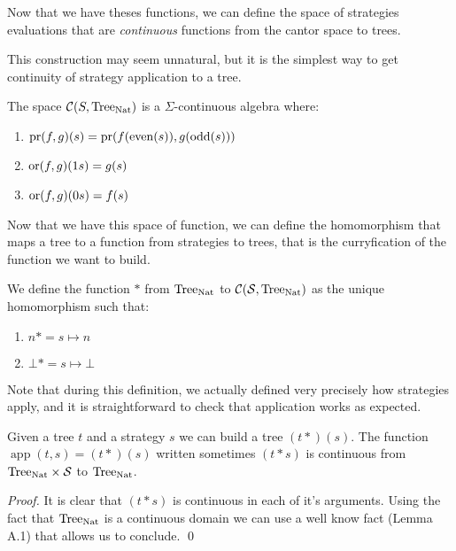 Now that we have theses functions, we can define the space 
of strategies evaluations that are \emph{continuous}
functions from the cantor space to trees. 

This construction may seem unnatural, but it is the simplest 
way to get continuity of strategy application to a tree.

\begin{adefinition}
    The space $\mathcal{C}(S,\textnormal{Tree}_{\textnormal{Nat}})$ is a $\Sigma$-continuous 
    algebra where:

    \begin{enumerate}
        \item $\operatorname{pr} (f,g) (s) = \operatorname{pr} (f (\operatorname{even}(s)), g(\operatorname{odd} (s)))$ 
        \item $\operatorname{or} (f,g) (1 s)      = g(s)$
        \item $\operatorname{or} (f,g) (0 s)      = f(s)$
    \end{enumerate}
\end{adefinition}

Now that we have this space of function, we can define the 
homomorphism that maps a tree to a function from strategies 
to trees, that is the curryfication of the function we want to build.

\begin{adefinition}
    We define the function $*$ from $\textnormal{Tree}_{\textnormal{Nat}}$ to $\mathcal{C}(\mathcal{S},\textnormal{Tree}_{\textnormal{Nat}})$
    as the unique homomorphism such that:

    \begin{enumerate}
        \item $n* = s \mapsto n$
        \item $\bot* = s \mapsto \bot$
    \end{enumerate}
\end{adefinition}

Note that during this definition, we actually defined very precisely 
how strategies apply, and it is straightforward to check that 
application works as expected.

\begin{alemma}[Continuity]
    Given a tree $t$ and a strategy $s$ we can 
    build a tree $(t*) (s)$. The function 
    $\operatorname{app}(t,s) = (t*)(s)$ written sometimes
    $(t*s)$ 
    is continuous 
    from $\textnormal{Tree}_{\textnormal{Nat}} \times \mathcal{S}$ to $\textnormal{Tree}_{\textnormal{Nat}}$.
\end{alemma}

\begin{ensps}
\begin{proof}
    It is clear that $(t*s)$ is continuous in each of it's 
    arguments. Using the fact that $\textnormal{Tree}_{\textnormal{Nat}}$ is a 
    continuous domain we can use a well know fact 
    \cite{battenfeld2009two} (Lemma A.1) that allows us to conclude.
    \qed
\end{proof}
\end{ensps}


